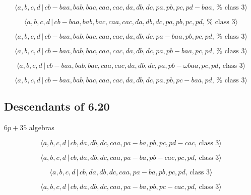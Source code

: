 \documentclass[10pt]{article}
\begin{document}
\begin{equation}
\langle a,b,c,d\,|\,cb-baa,bab,bac,caa,cac,da,db,dc,pa,pb,pc,pd-baa,\,\text{%
class }3\rangle  \tag{7.3827}
\end{equation}

\begin{equation}
\langle a,b,c,d\,|\,cb-baa,bab,bac,caa,cac,da,db,dc,pa,pb,pc,pd,\,\text{%
class }3\rangle  \tag{7.3828}
\end{equation}

\begin{equation}
\langle a,b,c,d\,|\,cb-baa,bab,bac,caa,cac,da,db,dc,pa-baa,pb,pc,pd,\,\text{%
class }3\rangle  \tag{7.3829}
\end{equation}

\begin{equation}
\langle a,b,c,d\,|\,cb-baa,bab,bac,caa,cac,da,db,dc,pa,pb-baa,pc,pd,\,\text{%
class }3\rangle  \tag{7.3830}
\end{equation}

\begin{equation}
\langle a,b,c,d\,|\,cb-baa,bab,bac,caa,cac,da,db,dc,pa,pb-\omega baa,pc,pd,\,%
\text{class }3\rangle  \tag{7.3831}
\end{equation}

\begin{equation}
\langle a,b,c,d\,|\,cb-baa,bab,bac,caa,cac,da,db,dc,pa,pb,pc-baa,pd,\,\text{%
class }3\rangle  \tag{7.3832}
\end{equation}

\subsection{Descendants of 6.20}

$6p+35$ algebras

\begin{equation}
\langle a,b,c,d\,|\,cb,da,db,dc,caa,pa-ba,pb,pc,pd-cac,\,\text{class }%
3\rangle  \tag{7.3833}
\end{equation}

\begin{equation}
\langle a,b,c,d\,|\,cb,da,db,dc,caa,pa-ba,pb-cac,pc,pd,\,\text{class }%
3\rangle  \tag{7.3834}
\end{equation}

\begin{equation}
\langle a,b,c,d\,|\,cb,da,db,dc,caa,pa-ba,pb,pc,pd,\,\text{class }3\rangle 
\tag{7.3835}
\end{equation}

\begin{equation}
\langle a,b,c,d\,|\,cb,da,db,dc,caa,pa-ba,pb,pc-cac,pd,\,\text{class }%
3\rangle  \tag{7.3836}
\end{equation}
\end{document}
